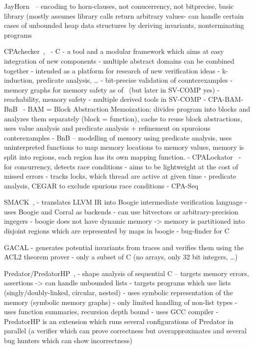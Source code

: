 JayHorn~\cite{Kahsai2019}
-- encoding to horn-clauses, not conucerrency, not bitprecise, basic library (mostly assumes library calls return arbitrary values- can handle certain cases of unbounded heap data structures by deriving invariants, nonterminating programs

CPAchecker~\cite{Dangl2015},~\cite{Beyer2011}
- C
- a tool and a modular framework which aims at easy integration of new components
- multiple abstract domains can be combined together
- intended as a platform for research of new verification ideas
- k-induction, predicate analysis, …
- bit-precise validation of counterexamples
- memory graphs for memory safety as of~\cite{Dangl2015} (but later in SV-COMP yes)
- reachability, memory safety
- multiple derived tools in SV-COMP
  - CPA-BAM-BnB~\cite{Andrianov2017}
    - BAM = Block Abstraction Memoization: divides program into blocks and analyzes them separately (block = function), cache to reuse block abstractions, uses value analysis and predicate analysis + refinement on spuroious conterexamples
    - BnB -- modelling of memory using predicate analysis, uses uninterpreted functions to map memory locations to memory values, memory is split into regions, each region has its own mapping function.
  - CPALockator~\cite{Andrianov2018}
    - for concurrency, detects race conditions
    - aims to be lightweight at the cost of missed errors
    - tracks locks, which thread are active at given time
    - predicate analysis, CEGAR to exclude spurious race conditions
  - CPA-Seq


SMACK~\cite{Rakamaric2014}, \cite{Haran2015}
- translates LLVM IR into Boogie intermediate verification language
- uses Boogie and Corral as backends
- can use bitvectors or arbitrary-precision ingegers
- boogie does not have dynamic memory -> memory is partitioned into disjoint regions which are represented by maps in boogie
- bug-finder for C

GACAL
- generates potential invariants from traces and verifies them using the ACL2 theorem prover
- only a subset of C (no arrays, only 32 bit integers, …)

Predator/PredatorHP~\cite{Peringer2020}, \cite{Dudka2013}
- shape analysis of sequential C -- targets memory errors, assertions -> can handle unbounded lists
  - targets programs which use lists (singly/doubly-linked, circular, nested)
  - uses symbolic representation of the memory (symbolic memory graphs)
- only limited handling of non-list types
- uses function summaries, recursion depth bound
- uses GCC compiler
- PredatorHP is an extension which runs several configurations of Predator in parallel (a verifier which can prove correctness but overapproximates and several bug hunters which can show incorrectness)


